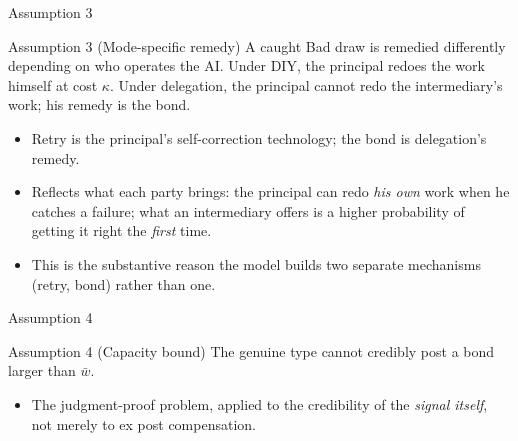 \documentclass[11pt,aspectratio=169]{beamer}
\newcommand{\wbar}{\bar w}
\begin{document}
\begin{frame}{Assumption 3}
\begin{exampleblock}{Assumption 3 (Mode-specific remedy)}
A caught Bad draw is remedied differently depending on who operates the AI. Under DIY, the principal redoes the work himself at cost $\kappa$. Under delegation, the principal cannot redo the intermediary's work; his remedy is the bond.
\end{exampleblock}
\vfill
\begin{itemize}
  \item Retry is the principal's self-correction technology; the bond is delegation's remedy.
  \item Reflects what each party brings: the principal can redo \emph{his own} work when he catches a failure; what an intermediary offers is a higher probability of getting it right the \emph{first} time.
  \item This is the substantive reason the model builds two separate mechanisms (retry, bond) rather than one.
\end{itemize}
\end{frame}

\begin{frame}{Assumption 4}
\begin{exampleblock}{Assumption 4 (Capacity bound)}
The genuine type cannot credibly post a bond larger than $\wbar$.
\end{exampleblock}
\vfill
\begin{itemize}
  \item The judgment-proof problem, applied to the credibility of the \emph{signal itself}, not merely to ex post compensation.
\end{itemize}
\end{frame}
\end{document}
